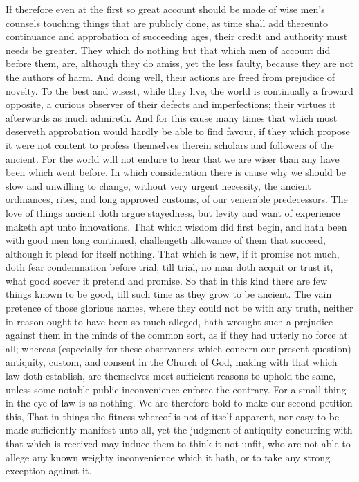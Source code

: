 If therefore even at the first so great account should be made of wise men’s counsels touching things that are publicly done, as time shall add thereunto continuance and approbation  of succeeding ages, their credit and authority must needs be greater. They which do nothing but that which men of account did before them, are, although they do amiss, yet the less faulty, because they are not the authors of harm. And doing well, their actions are freed from prejudice of novelty. To the best and wisest, while they live, the world is continually a froward opposite, a curious observer of their defects and imperfections; their virtues it afterwards as much admireth. And for this cause many times that which most deserveth approbation would hardly be able to find favour, if they which propose it were not content to profess themselves therein scholars and followers of the ancient. For the world will not endure to hear that we are wiser than any have been which went before. In which consideration there is cause why we should be slow and unwilling to change, without very urgent necessity, the ancient ordinances, rites, and long approved customs, of our venerable predecessors. The love of things ancient doth argue stayedness, but levity and want of experience maketh apt unto innovations. That which wisdom did first begin, and hath been with good men long continued, challengeth allowance of them that succeed, although it plead for itself nothing. That which is new, if it promise not much, doth fear condemnation before trial; till trial, no man doth acquit or trust it, what good soever it pretend and promise. So that in this kind there are few things known to be good, till such time as they grow to be ancient. The vain pretence of those glorious names, where they could not be with any truth, neither in reason ought to have been so much alleged, hath wrought such a prejudice against them in the minds of the common sort, as if they had utterly no force at all; whereas (especially for these observances which concern our present question) antiquity, custom, and consent in the Church of God, making with that which law doth establish, are themselves most sufficient reasons to uphold the  same, unless some notable public inconvenience enforce the contrary. For a small thing in the eye of law is as nothing.
We are therefore bold to make our second petition this, That in things the fitness whereof is not of itself apparent, nor easy to be made sufficiently manifest unto all, yet the judgment of antiquity concurring with that which is received may induce them to think it not unfit, who are not able to allege any known weighty inconvenience which it hath, or to take any strong exception against it.

